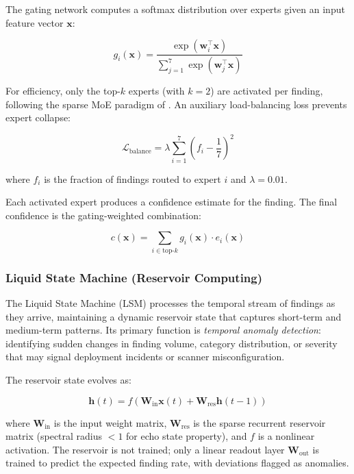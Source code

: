 \documentclass[11pt,a4paper]{article}
\begin{document}
The gating network computes a softmax distribution over experts given an input feature vector $\mathbf{x}$:

\begin{equation}
g_i(\mathbf{x}) = \frac{\exp(\mathbf{w}_i^\top \mathbf{x})}{\sum_{j=1}^{7} \exp(\mathbf{w}_j^\top \mathbf{x})}
\label{eq:gating}
\end{equation}

For efficiency, only the top-$k$ experts (with $k=2$) are activated per finding, following the sparse MoE paradigm of \citet{shazeer2017}. An auxiliary load-balancing loss prevents expert collapse:

\begin{equation}
\mathcal{L}_{\text{balance}} = \lambda \sum_{i=1}^{7} \left( f_i - \frac{1}{7} \right)^2
\label{eq:balance}
\end{equation}

\noindent where $f_i$ is the fraction of findings routed to expert $i$ and $\lambda = 0.01$.

Each activated expert produces a confidence estimate for the finding. The final confidence is the gating-weighted combination:

\begin{equation}
c(\mathbf{x}) = \sum_{i \in \text{top-}k} g_i(\mathbf{x}) \cdot e_i(\mathbf{x})
\label{eq:moe_confidence}
\end{equation}

\subsubsection{Liquid State Machine (Reservoir Computing)}
\label{subsubsec:lsm}

The Liquid State Machine (LSM) \citep{maass2002} processes the temporal stream of findings as they arrive, maintaining a dynamic reservoir state that captures short-term and medium-term patterns. Its primary function is \emph{temporal anomaly detection}: identifying sudden changes in finding volume, category distribution, or severity that may signal deployment incidents or scanner misconfiguration.

The reservoir state evolves as:

\begin{equation}
\mathbf{h}(t) = f\!\left( \mathbf{W}_{\text{in}} \mathbf{x}(t) + \mathbf{W}_{\text{res}} \mathbf{h}(t-1) \right)
\label{eq:lsm}
\end{equation}

\noindent where $\mathbf{W}_{\text{in}}$ is the input weight matrix, $\mathbf{W}_{\text{res}}$ is the sparse recurrent reservoir matrix (spectral radius $< 1$ for echo state property), and $f$ is a nonlinear activation. The reservoir is not trained; only a linear readout layer $\mathbf{W}_{\text{out}}$ is trained to predict the expected finding rate, with deviations flagged as anomalies.
\end{document}

